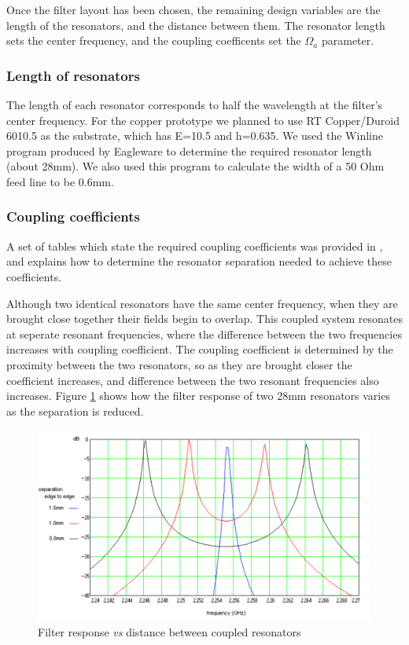 Once the filter layout has been chosen, the remaining design variables are the length of the resonators, and the distance between them. The resonator length sets the center frequency, and the coupling coefficents set the $\Omega_a$ parameter.


\subsubsection{Length of resonators}
The length of each resonator corresponds to half the wavelength at the filter's center frequency. For the copper prototype we planned to use RT Copper/Duroid 6010.5 as the substrate, which has E=10.5 and h=0.635. We used the Winline program produced by Eagleware to determine the required resonator length (about 28mm). We also used this program to calculate the width of a 50 Ohm feed line to be 0.6mm.


\subsubsection{Coupling coefficients}
A set of tables which state the required coupling coefficients was provided in \cite{hong:microstrip}, and \cite{hong:couplings} explains how to determine the resonator separation needed to achieve these coefficients.

Although two identical resonators have the same center frequency, when they are brought close together their fields begin to overlap. This coupled system resonates at seperate resonant frequencies, where the difference between the two frequencies increases with coupling coefficient. The coupling coefficient is determined by the proximity between the two resonators, so as they are brought closer the coefficient increases, and difference between the two resonant frequencies also increases. Figure \ref{figure:design-resonant-frequeny-splitting} shows how the filter response of two 28mm resonators varies as the separation is reduced.

\begin{figure}
\hspace{-4em}
\includegraphics[scale=0.6]{fig/design-resonant-frequency-splitting.pdf}
\caption{Filter response \emph{vs} distance between coupled resonators}
\label{figure:design-resonant-frequeny-splitting}
\end{figure}

